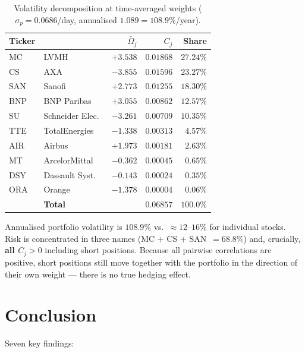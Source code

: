 \documentclass[10pt, a4paper]{article}
\begin{document}
\begin{table}[H]
\centering
\caption{Volatility decomposition at time-averaged weights
         ($\sigma_p = 0.0686$/day, annualised $1.089 = 108.9\%$/year).}
\label{tab:vol}
\small
\begin{tabular}{llrrr}
\toprule
Ticker & & $\bar\Omega_j$ & $C_j$ & Share \\
\midrule
MC  & LVMH               & $+3.538$ & $0.01868$ & $27.24\%$ \\
CS  & AXA                & $-3.855$ & $0.01596$ & $23.27\%$ \\
SAN & Sanofi             & $+2.773$ & $0.01255$ & $18.30\%$ \\
BNP & BNP Paribas        & $+3.055$ & $0.00862$ & $12.57\%$ \\
SU  & Schneider Elec.\   & $-3.261$ & $0.00709$ & $10.35\%$ \\
TTE & TotalEnergies      & $-1.338$ & $0.00313$ & $ 4.57\%$ \\
AIR & Airbus             & $+1.973$ & $0.00181$ & $ 2.63\%$ \\
MT  & ArcelorMittal      & $-0.362$ & $0.00045$ & $ 0.65\%$ \\
DSY & Dassault Syst.      & $-0.143$ & $0.00024$ & $ 0.35\%$ \\
ORA & Orange             & $-1.378$ & $0.00004$ & $ 0.06\%$ \\
\midrule
    & \textbf{Total}     &          & $0.06857$ & $100.0\%$ \\
\bottomrule
\end{tabular}
\end{table}

Annualised portfolio volatility is $108.9\%$ vs.\ $\approx 12$--$16\%$ for individual
stocks. Risk is concentrated in three names (MC + CS + SAN~$= 68.8\%$) and,
crucially, \textbf{all $C_j > 0$} including short positions. Because all pairwise
correlations are positive, short positions still move together with the portfolio in
the direction of their own weight --- there is no true hedging effect.

\section{Conclusion}

Seven key findings:
\end{document}
